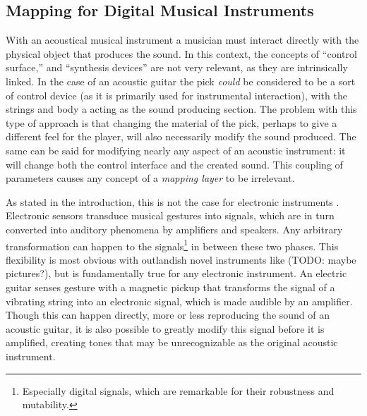 
\subsection{Mapping for Digital Musical Instruments} \label{sec:mappingforDMIs}

With an acoustical musical instrument a musician must interact directly with the physical object that produces the sound. In this context, the concepts of ``control surface,'' and ``synthesis devices'' are not very relevant, as they are intrinsically linked. In the case of an acoustic guitar the pick \emph{could} be considered to be a sort of control device (as it is primarily used for instrumental interaction), with the strings and body a acting as the sound producing section. The problem with this type of approach is that changing the material of the pick, perhaps to give a different feel for the player, will also necessarily modify the sound produced. The same can be said for modifying nearly any aspect of an acoustic instrument: it will change both the control interface and the created sound. This coupling of parameters causes any concept of a \emph{mapping layer} to be irrelevant.

As stated in the introduction, this is not the case for electronic instruments . Electronic sensors transduce musical gestures into signals, which are in turn converted into auditory phenomena by amplifiers and speakers. Any arbitrary transformation can happen to the signals\footnote{Especially digital signals, which are remarkable for their robustness and mutability.} in between these two phases. This flexibility is most obvious with outlandish novel instruments like (TODO: maybe pictures?), but is fundamentally true for any electronic instrument. An electric guitar senses gesture with a magnetic pickup that transforms the signal of a vibrating string into an electronic signal, which is made audible by an amplifier. Though this can happen directly, more or less reproducing the sound of an acoustic guitar, it is also possible to greatly modify this signal before it is amplified, creating tones that may be unrecognizable as the original acoustic instrument.

